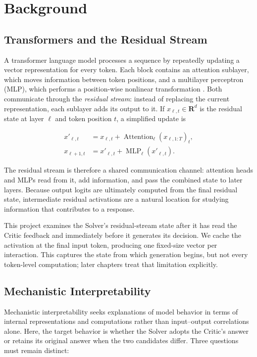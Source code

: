 \chapter{Background}
\label{chap:background}

\section{Transformers and the Residual Stream}

A transformer language model processes a sequence by repeatedly updating a vector representation for every token. Each block contains an attention sublayer, which moves information between token positions, and a multilayer perceptron (MLP), which performs a position-wise nonlinear transformation \cite{vaswani2017attention}. Both communicate through the \emph{residual stream}: instead of replacing the current representation, each sublayer adds its output to it. If $x_{\ell,t}\in\mathbf{R}^{d}$ is the residual state at layer $\ell$ and token position $t$, a simplified update is

\begin{align}
x'_{\ell,t} &= x_{\ell,t}+\operatorname{Attention}_{\ell}(x_{\ell,1:T})_t, \\
x_{\ell+1,t} &= x'_{\ell,t}+\operatorname{MLP}_{\ell}(x'_{\ell,t}).
\end{align}

The residual stream is therefore a shared communication channel: attention heads and MLPs read from it, add information, and pass the combined state to later layers. Because output logits are ultimately computed from the final residual state, intermediate residual activations are a natural location for studying information that contributes to a response.

This project examines the Solver's residual-stream state after it has read the Critic feedback and immediately before it generates its decision. We cache the activation at the final input token, producing one fixed-size vector per interaction. This captures the state from which generation begins, but not every token-level computation; later chapters treat that limitation explicitly.

\section{Mechanistic Interpretability}

Mechanistic interpretability seeks explanations of model behavior in terms of internal representations and computations rather than input--output correlations alone. Here, the target behavior is whether the Solver adopts the Critic's answer or retains its original answer when the two candidates differ. Three questions must remain distinct:

